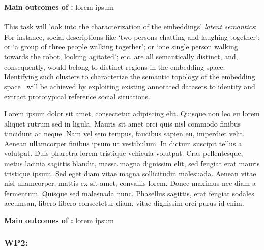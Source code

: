 \begin{framed}
    {\noindent\bf Main outcomes of \tAC:} lorem ipsum 
\end{framed}

\paragraph{\TAD}


This task will look into the characterization of the embeddings' \emph{latent
semantics}: For instance, social descriptions like `two persons chatting and
laughing together'; or `a group of three people walking together'; or `one
single person walking towards the robot, looking agitated'; etc.  are all
semantically distinct, and, consequently, would belong to distinct regions in
the embedding space. Identifying such clusters to characterize the semantic
topology of the embedding space~\cite{sun2023topological} will be achieved by
exploiting existing annotated datasets to identify and extract prototypical
reference social situations.

\begin{rewrite}
Lorem ipsum dolor sit amet, consectetur adipiscing elit. Quisque non leo eu
lorem aliquet rutrum sed in ligula. Mauris sit amet orci quis nisl commodo
finibus tincidunt ac neque. Nam vel sem tempus, faucibus sapien eu,
imperdiet velit. Aenean ullamcorper finibus ipsum ut vestibulum. In dictum
suscipit tellus a volutpat. Duis pharetra lorem tristique vehicula volutpat.
Cras pellentesque, metus lacinia sagittis blandit, massa magna dignissim
elit, sed feugiat erat mauris tristique ipsum. Sed eget diam vitae magna
sollicitudin malesuada. Aenean vitae nisl ullamcorper, mattis ex sit amet,
convallis lorem. Donec maximus nec diam a fermentum. Quisque sed malesuada
nunc. Phasellus sagittis, erat feugiat sodales accumsan, libero libero
consectetur diam, vitae dignissim orci purus id enim.

\end{rewrite}


\begin{framed}
    {\noindent\bf Main outcomes of \tAD:} lorem ipsum 
\end{framed}


\subsubsection{WP2: \textbf{\WPB}}


